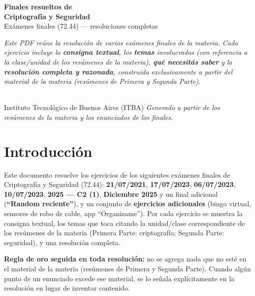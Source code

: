 \documentclass[11pt,a4paper]{article}
\begin{document}

\begin{titlepage}
\centering
\vspace*{2cm}
{\LARGE\bfseries\color{itbaCyanDark} Finales resueltos de\\[3pt]
Criptografía y Seguridad}\\[0.5cm]
{\large Exámenes finales (72.44) --- resoluciones completas}\\[0.9cm]

{\normalsize
\begin{minipage}{0.88\textwidth}\itshape
Este PDF reúne la resolución de varios exámenes finales de la materia. Cada ejercicio
incluye la \textbf{consigna textual}, los \textbf{temas} involucrados (con referencia a la
clase/unidad de los resúmenes de la materia), \textbf{qué necesitás saber} y la
\textbf{resolución completa y razonada}, construida exclusivamente a partir del material
de la materia (resúmenes de Primera y Segunda Parte).
\end{minipage}}\\[1.0cm]

{\normalsize Instituto Tecnológico de Buenos Aires (ITBA)}
\vfill
{\footnotesize\itshape Generado a partir de los resúmenes de la materia y los enunciados de los finales.}
\end{titlepage}

\tableofcontents
\newpage

\section*{Introducción}
Este documento resuelve los ejercicios de los siguientes exámenes finales de
Criptografía y Seguridad (72.44): \textbf{21/07/2021}, \textbf{17/07/2023},
\textbf{06/07/2023}, \textbf{10/07/2023}, \textbf{2025 --- C2 (1)}, \textbf{Diciembre 2025}
y un final adicional (\textbf{``Random reciente''}), y un conjunto de
\textbf{ejercicios adicionales} (bingo virtual, sensores de robo de cable, app
``Organizame''). Por cada ejercicio se muestra la consigna textual, los temas que toca
citando la unidad/clase correspondiente de los resúmenes de la materia (Primera Parte:
criptografía; Segunda Parte: seguridad), y una resolución completa.

\medskip
\noindent\textbf{Regla de oro seguida en toda resolución:} no se agrega nada que no esté
en el material de la materia (resúmenes de Primera y Segunda Parte). Cuando algún punto de
un enunciado excede ese material, se lo señala explícitamente en la resolución en lugar de
inventar contenido.
\end{document}
